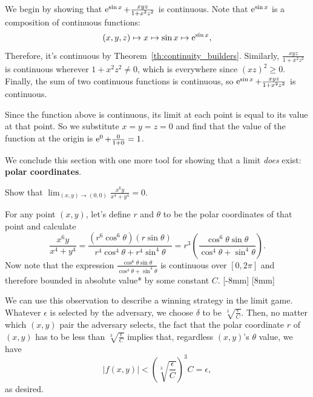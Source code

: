 \documentclass{watsonbook}
\begin{document}
\begin{solution}
  We begin by showing that $\operatorname{e}^{\sin x} + \frac{xyz}{1 + x^2 z^2}$ is
    continuous.  Note that $\operatorname{e}^{\sin x}$ is a composition of continuous
    functions: 
  \[
  (x,y,z) \mapsto x \mapsto \sin x \mapsto \operatorname{e}^{\sin x}, 
  \]
  Therefore, it's continuous by Theorem~\ref{th:continuity_builders}. Similarly,
  $\frac{xyz}{1 + x^2 z^2}$ is continuous wherever $1 + x^2 z^2 \neq
  0$, which is everywhere since $(xz)^2 \geq 0$. Finally, the sum of
  two continuous functions is continuous, so $\operatorname{e}^{\sin x} +
  \frac{xyz}{1 + x^2 z^2}$ is continuous.

  Since the function above is continuous, its limit at each point is
  equal to its value at that point. So we substitute $x=y=z=0$ and
  find that the value of the function at the origin is
  $\operatorname{e}^0 + \frac{0}{1+0} = 1$.
\end{solution}

We conclude this section with one more tool for showing that a limit
\textit{does} exist: \textbf{polar coordinates}.

\begin{example}{}{}
  Show that $\displaystyle{\lim_{(x,y) \to (0,0)}\frac{x^6 y}{x^4 + y^4} = 0}$. 
\end{example}

\begin{solution}
  For any point $(x,y)$, let's define $r$ and $\theta$ to be the polar
  coordinates of that point and calculate
  \[
    \frac{x^6 y}{x^4 + y^4} = \frac{(r^6 \cos^6 \theta) (r\sin \theta)}{r^4
      \cos^4 \theta + r^4\sin^4 \theta} = r^3 \left(\frac{\cos^6\theta \sin
      \theta}{ \cos^4 \theta + \sin^4\theta}\right). 
  \]
  Now note that the expression $\frac{\cos^6\theta \sin
      \theta}{ \cos^4 \theta + \sin^4\theta}$ is continuous over
    $[0,2\pi]$ and therefore bounded in absolute value* by some
    constant $C$. [-8mm]
    [8mm]

    We can use this observation to describe a winning strategy in the
    limit game. Whatever $\epsilon$ is selected by the adversary, we
    choose $\delta$ to be $\sqrt[3]{\frac{\epsilon}{C}}$. Then, 
    no matter which $(x,y)$ pair the adversary selects, the fact that
    the polar coordinate $r$ of $(x,y)$ has to be less than
    $\sqrt[3]{\frac{\epsilon}{C}}$ implies that, regardless $(x,y)$'s
    $\theta$ value, we have 
    \[
      |f(x,y)| <  \left(\sqrt[3]{\frac{\epsilon}{C}}\right)^3 C =
      \epsilon, 
    \]
    as desired. 
  \end{solution}
\end{document}
